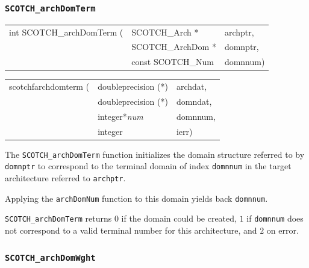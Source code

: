 \subsubsection{{\tt SCOTCH\_archDomTerm}}

\begin{itemize}
\progsyn

{\tt\begin{tabular}{l@{}ll}
int SCOTCH\_archDomTerm ( & SCOTCH\_Arch *    & archptr, \\
                          & SCOTCH\_ArchDom * & domnptr, \\
                          & const SCOTCH\_Num & domnnum) \\
\end{tabular}}

{\tt\begin{tabular}{l@{}ll}
scotchfarchdomterm ( & doubleprecision (*) & archdat, \\
                     & doubleprecision (*) & domndat, \\
                     & integer*{\it num}   & domnnum, \\
                     & integer             & ierr)
\end{tabular}}

\progdes

The {\tt SCOTCH\_archDomTerm} function initializes the domain
structure referred to by {\tt domnptr} to correspond to the
terminal domain of index {\tt domnnum} in the target architecture
referred to {\tt archptr}.

Applying the {\tt arch\lbt Dom\lbt Num} function to this domain
yields back {\tt domnnum}.

\progret

{\tt SCOTCH\_archDomTerm} returns $0$ if the domain could be created,
$1$ if {\tt domnnum} does not correspond to a valid terminal number
for this architecture, and $2$ on error.
\end{itemize}

\subsubsection{{\tt SCOTCH\_archDomWght}}

